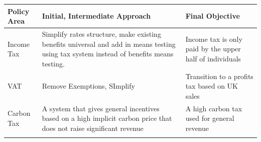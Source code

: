 \documentclass[]{tufte-handout}
\begin{document}
\begin{longtable}[]{@{}lll@{}}
\toprule
\begin{minipage}[b]{0.20\columnwidth}\raggedright
\textbf{Policy Area}\strut
\end{minipage} & \begin{minipage}[b]{0.36\columnwidth}\raggedright
\textbf{Initial, Intermediate Approach}\strut
\end{minipage} & \begin{minipage}[b]{0.36\columnwidth}\raggedright
\textbf{Final Objective}\strut
\end{minipage}\tabularnewline
\midrule
\endhead
\begin{minipage}[t]{0.20\columnwidth}\raggedright
Income Tax\strut
\end{minipage} & \begin{minipage}[t]{0.36\columnwidth}\raggedright
Simplify rates structure, make existing benefits universal and add in
means testing using tax system instead of benefits means testing.\strut
\end{minipage} & \begin{minipage}[t]{0.36\columnwidth}\raggedright
Income tax is only paid by the upper half of individuals\strut
\end{minipage}\tabularnewline
\begin{minipage}[t]{0.20\columnwidth}\raggedright
VAT\strut
\end{minipage} & \begin{minipage}[t]{0.36\columnwidth}\raggedright
Remove Exemptions, SImplify\strut
\end{minipage} & \begin{minipage}[t]{0.36\columnwidth}\raggedright
Transition to a profits tax based on UK sales\strut
\end{minipage}\tabularnewline
\begin{minipage}[t]{0.20\columnwidth}\raggedright
Carbon Tax\strut
\end{minipage} & \begin{minipage}[t]{0.36\columnwidth}\raggedright
A system that gives general incentives based on a high implicit carbon
price that does not raise significant revenue\strut
\end{minipage} & \begin{minipage}[t]{0.36\columnwidth}\raggedright
A high carbon tax used for general revenue\strut
\end{minipage}\tabularnewline
\begin{minipage}[t]{0.20\columnwidth}\raggedright

\end{minipage}
\end{longtable}
\end{document}
